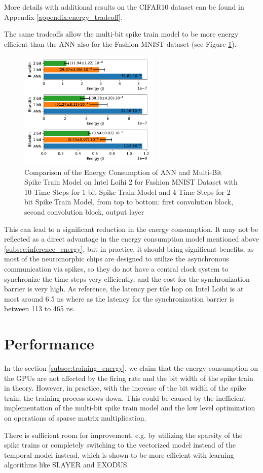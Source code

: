         More details with additional results on the CIFAR10 dataset can be found in Appendix \ref{appendix:energy_tradeoff}.

        The same tradeoffs allow the multi-bit spike train model to be more energy efficient than the ANN also for the Fashion MNIST dataset (see Figure \ref{fig:energy_ann_vs_snn_timesteps}).
        \begin{figure}[H]
            \centering
            \includegraphics[width=0.6\textwidth]{../timesteps/FashionMNIST/plots/fashionmnist_energy_ann_vs_snn.pdf}
            \caption{Comparison of the Energy Consumption of ANN and Multi-Bit Spike Train Model on Intel Loihi 2 for Fashion MNIST Dataset with 10 Time Steps for 1-bit Spike Train Model and 4 Time Steps for 2-bit Spike Train Model, from top to bottom: first convolution block, second convolution block, output layer}
            \label{fig:energy_ann_vs_snn_timesteps}
        \end{figure}

        This can lead to a significant reduction in the energy consumption. It may not be reflected as a direct advantage in the energy consumption model mentioned above \ref{subsec:inference_energy}, but in practice, it should bring significant benefits, as most of the neuromorphic chips are designed to utilize the asynchronous communication via spikes, so they do not have a central clock system to synchronize the time steps very efficiently, and the cost for the synchronization barrier is very high. As reference, the latency per tile hop on Intel Loihi is at most around 6.5 ns where as the latency for the synchronization barrier is between 113 to 465 ns. 

\section{Performance}
\label{sec:performance}
    In the section \ref{subsec:training_energy}, we claim that the energy consumption on the GPUs are not affected by the firing rate and the bit width of the spike train in theory. However, in practice, with the increase of the bit width of the spike train, the training process slows down. This could be caused by the inefficient implementation of the multi-bit spike train model and the low level optimization on operations of sparse matrix multiplication. 

    There is sufficient room for improvement, e.g. by utilizing the sparsity of the spike trains or completely switching to the vectorized model instead of the temporal model instead, which is shown to be more efficient with learning algorithms like SLAYER and EXODUS. 

